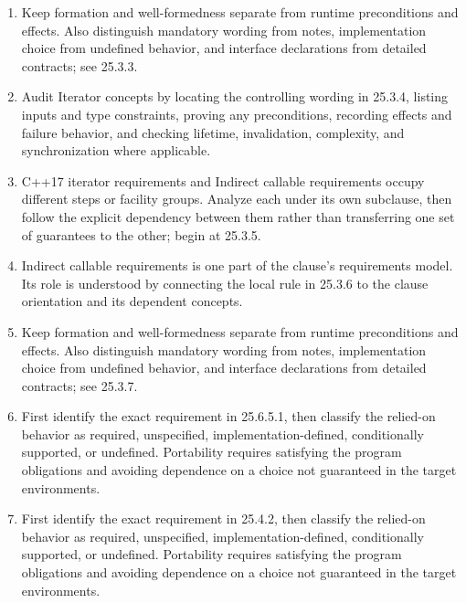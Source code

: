 \documentclass[11pt,letterpaper]{article}
\begin{document}
\begin{enumerate}
\item Keep formation and well-formedness separate from runtime preconditions and effects. Also distinguish mandatory wording from notes, implementation choice from undefined behavior, and interface declarations from detailed contracts; see 25.3.3.
\item Audit Iterator concepts by locating the controlling wording in 25.3.4, listing inputs and type constraints, proving any preconditions, recording effects and failure behavior, and checking lifetime, invalidation, complexity, and synchronization where applicable.
\item C++17 iterator requirements and Indirect callable requirements occupy different steps or facility groups. Analyze each under its own subclause, then follow the explicit dependency between them rather than transferring one set of guarantees to the other; begin at 25.3.5.
\item Indirect callable requirements is one part of the clause's requirements model. Its role is understood by connecting the local rule in 25.3.6 to the clause orientation and its dependent concepts.
\item Keep formation and well-formedness separate from runtime preconditions and effects. Also distinguish mandatory wording from notes, implementation choice from undefined behavior, and interface declarations from detailed contracts; see 25.3.7.
\item First identify the exact requirement in 25.6.5.1, then classify the relied-on behavior as required, unspecified, implementation-defined, conditionally supported, or undefined. Portability requires satisfying the program obligations and avoiding dependence on a choice not guaranteed in the target environments.
\item First identify the exact requirement in 25.4.2, then classify the relied-on behavior as required, unspecified, implementation-defined, conditionally supported, or undefined. Portability requires satisfying the program obligations and avoiding dependence on a choice not guaranteed in the target environments.
\end{enumerate}
\end{document}
